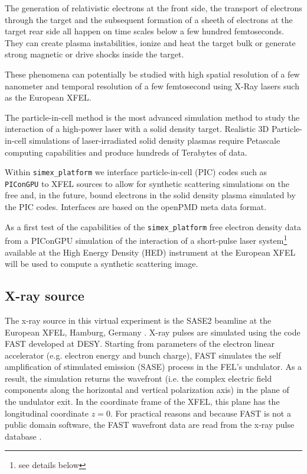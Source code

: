\documentclass[a4paper]{article}
\begin{document}
The generation of relativistic electrons at the front side, the transport of electrons through the target and the subsequent formation of a sheeth of electrons at the target rear side all happen on time scales below a few hundred femtoseconds. They can create plasma instabilities, ionize and heat the target bulk or generate strong magnetic or drive shocks inside the target.

These phenomena can potentially be studied with high spatial resolution of a few nanometer and temporal resolution of a few femtosecond using X-Ray lasers such as the European XFEL.

The particle-in-cell method is the most advanced simulation method to study the interaction of a high-power laser with a solid density target. Realistic 3D Particle-in-cell simulations of laser-irradiated solid density plasmas require Petascale computing capabilities and produce hundreds of Terabytes of data.

Within \texttt{simex\_platform} we interface particle-in-cell (PIC) codes such as \texttt{PIConGPU} to XFEL sources to allow for synthetic scattering simulations on the free and, in the future, bound electrons in the solid density plasma simulated by the PIC codes. Interfaces are based on the openPMD meta data format.

As a first test of the capabilities of the \texttt{simex\_platform} free electron density data from a PIConGPU simulation of the interaction of a short-pulse laser system\footnote{see details below} available at the High Energy Density (HED) instrument \cite{Nakatsutsumi2014} at the European XFEL will be used to compute a synthetic scattering image.
%
\subsection{X-ray source}
The x-ray source in this virtual experiment is the SASE2 beamline at the European XFEL, Hamburg, Germany \cite{Tschentscher2011}.
X-ray pulses are simulated using the code FAST \cite{Saldin1999} developed at DESY. Starting from parameters of the electron linear accelerator
(e.g. electron energy and bunch charge), FAST simulates the self amplification of stimulated emission (SASE) process \cite{} in the FEL's
undulator. As a result, the simulation returns the wavefront (i.e. the complex electric field components
along the horizontal and vertical polarization axis) in the plane of the undulator exit. In the coordinate frame of the
XFEL, this plane has the longitudinal coordinate $z=0$. For practical reasons and because FAST is not a public domain software,
the FAST wavefront data are read from the x-ray pulse database \cite{xpd_xfel}.
\end{document}
